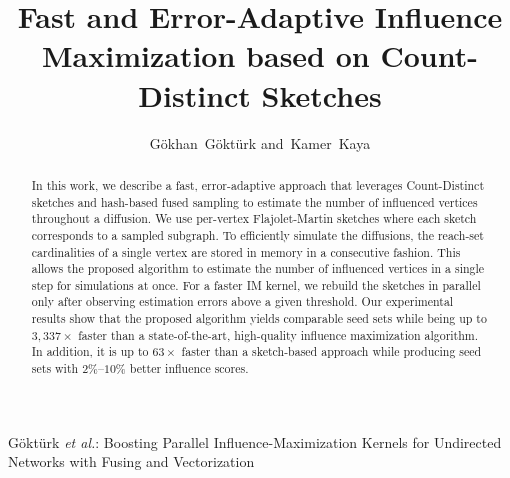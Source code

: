 



\title{Fast and Error-Adaptive Influence Maximization based on Count-Distinct Sketches}
        

        
\author{G\"{o}khan~G\"{o}kt\"{u}rk
        and~Kamer~Kaya%
}
\markboth{}%
{G\"{o}kt\"{u}rk \MakeLowercase{\textit{et al.}}: Boosting Parallel Influence-Maximization Kernels for Undirected Networks with Fusing and Vectorization}

\maketitle
\begin{abstract}
In this work, we describe a fast, error-adaptive approach that leverages Count-Distinct sketches and hash-based fused sampling to estimate the number of influenced vertices throughout a diffusion. We use per-vertex Flajolet-Martin sketches where each sketch corresponds to a sampled subgraph. To efficiently simulate the diffusions, the reach-set cardinalities of a single vertex are stored in memory in a consecutive fashion. This allows the proposed algorithm to estimate the number of influenced vertices in a single step for simulations at once. %
For a faster IM kernel, we rebuild the sketches in parallel only after observing estimation errors above a given threshold. Our experimental results show that the proposed algorithm yields comparable seed sets while being up to $3,337\times$ faster than a state-of-the-art, high-quality influence maximization algorithm. In addition, it is up to $63\times$ faster than a sketch-based approach while producing seed sets with $2\%$--$10\%$ better influence scores.
\end{abstract}


